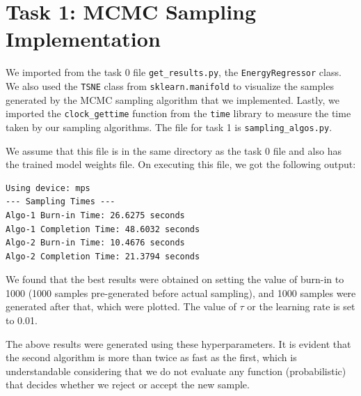 \documentclass{article}
\begin{document}
\section{Task 1: MCMC Sampling Implementation}
We imported from the task 0 file \texttt{get\_results.py}, the \texttt{EnergyRegressor} class. We also used the \texttt{TSNE} class from \texttt{sklearn.manifold} to visualize the samples generated by the MCMC sampling algorithm that we implemented. Lastly, we imported the \texttt{clock\_gettime} function from the \texttt{time} library to measure the time taken by our sampling algorithms. The file for task 1 is \texttt{sampling\_algos.py}.

We assume that this file is in the same directory as the task 0 file and also has the trained model weights file. On executing this file, we got the following output:
\begin{lstlisting}
Using device: mps
--- Sampling Times ---
Algo-1 Burn-in Time: 26.6275 seconds
Algo-1 Completion Time: 48.6032 seconds
Algo-2 Burn-in Time: 10.4676 seconds
Algo-2 Completion Time: 21.3794 seconds
\end{lstlisting}

We found that the best results were obtained on setting the value of burn-in to 1000 (1000 samples pre-generated before actual sampling), and 1000 samples were generated after that, which were plotted. The value of $\tau$ or the learning rate is set to 0.01.

The above results were generated using these hyperparameters. It is evident that the second algorithm is more than twice as fast as the first, which is understandable considering that we do not evaluate any function (probabilistic) that decides whether we reject or accept the new sample.
\end{document}

